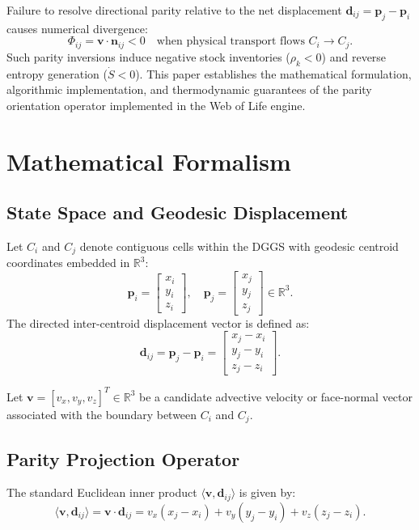 \documentclass[11pt,a4paper]{article}
\theoremstyle{plain}
\theoremstyle{definition}
\begin{document}
Failure to resolve directional parity relative to the net displacement $\mathbf{d}_{ij} = \mathbf{p}_j - \mathbf{p}_i$ causes numerical divergence:
\begin{equation}
    \Phi_{ij} = \mathbf{v} \cdot \mathbf{n}_{ij} < 0 \quad \text{when physical transport flows } C_i \to C_j.
\end{equation}
Such parity inversions induce negative stock inventories ($\rho_k < 0$) and reverse entropy generation ($\dot{S} < 0$). This paper establishes the mathematical formulation, algorithmic implementation, and thermodynamic guarantees of the parity orientation operator implemented in the Web of Life engine.

\section{Mathematical Formalism}

\subsection{State Space and Geodesic Displacement}
Let $C_i$ and $C_j$ denote contiguous cells within the DGGS with geodesic centroid coordinates embedded in $\mathbb{R}^3$:
\begin{equation}
    \mathbf{p}_i = \begin{bmatrix} x_i \\ y_i \\ z_i \end{bmatrix}, \quad 
    \mathbf{p}_j = \begin{bmatrix} x_j \\ y_j \\ z_j \end{bmatrix} \in \mathbb{R}^3.
\end{equation}
The directed inter-centroid displacement vector is defined as:
\begin{equation}
    \mathbf{d}_{ij} = \mathbf{p}_j - \mathbf{p}_i = \begin{bmatrix} x_j - x_i \\ y_j - y_i \\ z_j - z_i \end{bmatrix}.
\end{equation}

Let $\mathbf{v} = [v_x, v_y, v_z]^T \in \mathbb{R}^3$ be a candidate advective velocity or face-normal vector associated with the boundary between $C_i$ and $C_j$.

\subsection{Parity Projection Operator}
The standard Euclidean inner product $\langle \mathbf{v}, \mathbf{d}_{ij} \rangle$ is given by:
\begin{equation}
    \langle \mathbf{v}, \mathbf{d}_{ij} \rangle = \mathbf{v} \cdot \mathbf{d}_{ij} = v_x (x_j - x_i) + v_y (y_j - y_i) + v_z (z_j - z_i).
\end{equation}
\end{document}
